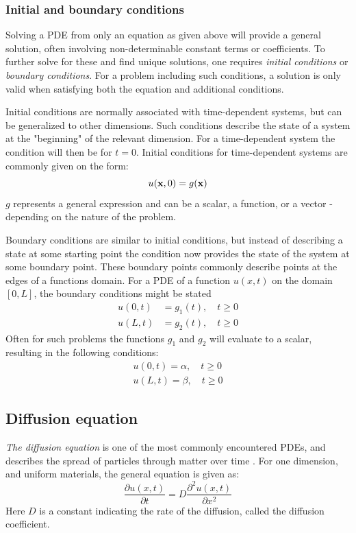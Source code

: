 \subsubsection{Initial and boundary conditions}
Solving a PDE from only an equation as given above will provide a general solution, often involving non-determinable constant terms or coefficients. To further solve for these and find unique solutions, one requires \textit{initial conditions} or \textit{boundary conditions}. For a problem including such conditions, a solution is only valid when satisfying both the equation and additional conditions. 

Initial conditions are normally associated with time-dependent systems, but can be generalized to other dimensions. Such conditions describe the state of a system at the "beginning" of the relevant dimension. For a time-dependent system the condition will then be for $t=0$. Initial conditions for time-dependent systems are commonly given on the form: 
\begin{equation}
    u(\bold{x}, 0) = g(\bold{x})
\end{equation}
$g$ represents a general expression and can be a scalar, a function, or a vector - depending on the nature of the problem. 

Boundary conditions are similar to initial conditions, but instead of describing a state at some starting point the condition now provides the state of the system at some boundary point. These boundary points commonly describe points at the edges of a functions domain. For a PDE of a function $u(x,t)$ on the domain $[0, L]$, the boundary conditions might be stated
\begin{equation}
    \begin{split}
        u(0, t) &= g_1(t), \quad t\geq0 \\
        u(L, t) &= g_2(t), \quad t\geq0
    \end{split}
\end{equation}
Often for such problems the functions $g_1$ and $g_2$ will evaluate to a scalar, resulting in the following conditions: 
\begin{equation}
    \begin{split}
        u(0, t) = \alpha, \quad t\geq0 \\
        u(L, t) = \beta, \quad t\geq0
    \end{split}
\end{equation}

\subsection{Diffusion equation}\label{sec:diffeq}
\textit{The diffusion equation} is one of the most commonly encountered PDEs, and describes the spread of particles through matter over time \citep[p. 18]{tveitoPDE}. For one dimension, and uniform materials, the general equation is given as:
\begin{equation}
    \frac{\partial u(x,t)}{\partial t} = D \frac{\partial^2 u(x,t)}{\partial x^2}
\end{equation}
Here $D$ is a constant indicating the rate of the diffusion, called the diffusion coefficient. 

